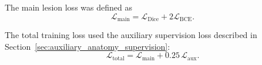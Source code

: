 The main lesion loss was defined as
\begin{equation}
    \mathcal{L}_{\mathrm{main}}
    =
    \mathcal{L}_{\mathrm{Dice}}
    +
    2\mathcal{L}_{\mathrm{BCE}}.
\end{equation}

The total training loss used the auxiliary supervision loss described in Section~\ref{sec:auxiliary_anatomy_supervision}:
\begin{equation}
    \mathcal{L}_{\mathrm{total}}
    =
    \mathcal{L}_{\mathrm{main}}
    +
    0.25\,\mathcal{L}_{\mathrm{aux}}.
\end{equation}